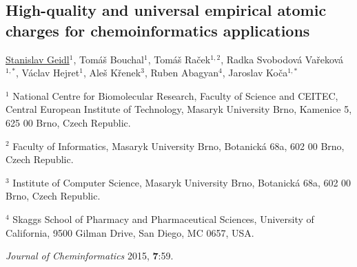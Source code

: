 \begin{center}
\section{High-quality and universal empirical atomic
charges for chemoinformatics applications}

\underline{Stanislav Geidl}$^1$, Tomáš Bouchal$^1$, Tomáš Raček$^{1,2}$,
Radka Svobodová Vařeková$^{1, *}$, Václav Hejret$^1$, Aleš Křenek$^3$,
Ruben Abagyan$^4$, Jaroslav Koča$^{1, *}$

\vspace{1cm}

$^1$ National Centre for Biomolecular Research, Faculty of Science and CEITEC,
Central European Institute of Technology, Masaryk University Brno, Kamenice 5,
625 00 Brno, Czech Republic.

$^2$ Faculty of Informatics, Masaryk University Brno, Botanická 68a, 602 00 Brno,
Czech Republic.

$^3$ Institute of Computer Science, Masaryk University Brno, Botanická 68a,
602 00 Brno, Czech Republic.

$^4$ Skaggs School of Pharmacy and Pharmaceutical Sciences, University of
California, 9500 Gilman Drive, San Diego, MC 0657, USA.

\vspace{1cm}

\textit{Journal of Cheminformatics} 2015, \textbf{7}:59.

\end{center}




